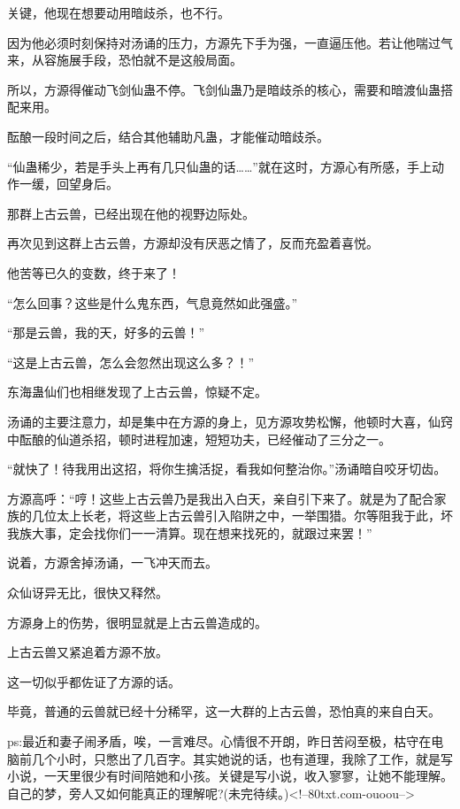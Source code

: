 \begin{this_body}
关键，他现在想要动用暗歧杀，也不行。

因为他必须时刻保持对汤诵的压力，方源先下手为强，一直逼压他。若让他喘过气来，从容施展手段，恐怕就不是这般局面。

所以，方源得催动飞剑仙蛊不停。飞剑仙蛊乃是暗歧杀的核心，需要和暗渡仙蛊搭配来用。

酝酿一段时间之后，结合其他辅助凡蛊，才能催动暗歧杀。

“仙蛊稀少，若是手头上再有几只仙蛊的话……”就在这时，方源心有所感，手上动作一缓，回望身后。

那群上古云兽，已经出现在他的视野边际处。

再次见到这群上古云兽，方源却没有厌恶之情了，反而充盈着喜悦。

他苦等已久的变数，终于来了！

“怎么回事？这些是什么鬼东西，气息竟然如此强盛。”

“那是云兽，我的天，好多的云兽！”

“这是上古云兽，怎么会忽然出现这么多？！”

东海蛊仙们也相继发现了上古云兽，惊疑不定。

汤诵的主要注意力，却是集中在方源的身上，见方源攻势松懈，他顿时大喜，仙窍中酝酿的仙道杀招，顿时进程加速，短短功夫，已经催动了三分之一。

“就快了！待我用出这招，将你生擒活捉，看我如何整治你。”汤诵暗自咬牙切齿。

方源高呼：“哼！这些上古云兽乃是我出入白天，亲自引下来了。就是为了配合家族的几位太上长老，将这些上古云兽引入陷阱之中，一举围猎。尔等阻我于此，坏我族大事，定会找你们一一清算。现在想来找死的，就跟过来罢！”

说着，方源舍掉汤诵，一飞冲天而去。

众仙讶异无比，很快又释然。

方源身上的伤势，很明显就是上古云兽造成的。

上古云兽又紧追着方源不放。

这一切似乎都佐证了方源的话。

毕竟，普通的云兽就已经十分稀罕，这一大群的上古云兽，恐怕真的来自白天。

ps:最近和妻子闹矛盾，唉，一言难尽。心情很不开朗，昨日苦闷至极，枯守在电脑前几个小时，只憋出了几百字。其实她说的话，也有道理，我除了工作，就是写小说，一天里很少有时间陪她和小孩。关键是写小说，收入寥寥，让她不能理解。自己的梦，旁人又如何能真正的理解呢?(未完待续。)<!--80txt.com-ouoou-->

\end{this_body}

